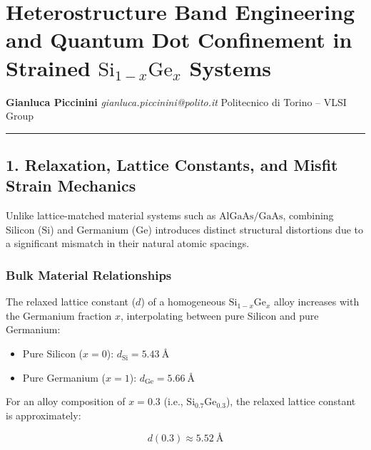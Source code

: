 \documentclass[
]{article}
\providecommand{\tightlist}{%
  \setlength{\itemsep}{0pt}\setlength{\parskip}{0pt}}
\begin{document}
\section{\texorpdfstring{Heterostructure Band Engineering and Quantum
Dot Confinement in Strained \(\text{Si}_{1-x}\text{Ge}_x\)
Systems}{Heterostructure Band Engineering and Quantum Dot Confinement in Strained \textbackslash text\{Si\}\_\{1-x\}\textbackslash text\{Ge\}\_x Systems}}\label{heterostructure-band-engineering-and-quantum-dot-confinement-in-strained-textsi_1-xtextge_x-systems}

\textbf{Gianluca Piccinini} \emph{gianluca.piccinini@polito.it}
Politecnico di Torino -- VLSI Group

\begin{center}\rule{0.5\linewidth}{0.5pt}\end{center}

\subsection{1. Relaxation, Lattice Constants, and Misfit Strain
Mechanics}\label{relaxation-lattice-constants-and-misfit-strain-mechanics}

Unlike lattice-matched material systems such as \(\text{AlGaAs/GaAs}\),
combining Silicon (\(\text{Si}\)) and Germanium (\(\text{Ge}\))
introduces distinct structural distortions due to a significant mismatch
in their natural atomic spacings.

\subsubsection{Bulk Material
Relationships}\label{bulk-material-relationships}

The relaxed lattice constant (\(d\)) of a homogeneous
\(\text{Si}_{1-x}\text{Ge}_x\) alloy increases with the Germanium
fraction \(x\), interpolating between pure Silicon and pure Germanium:

\begin{itemize}
\tightlist
\item
  Pure Silicon (\(x = 0\)): \(d_{\text{Si}} = 5.43\ \text{Å}\)
\item
  Pure Germanium (\(x = 1\)): \(d_{\text{Ge}} = 5.66\ \text{Å}\)
\end{itemize}

For an alloy composition of \(x = 0.3\) (i.e.,
\(\text{Si}_{0.7}\text{Ge}_{0.3}\)), the relaxed lattice constant is
approximately:

\[d(0.3) \approx 5.52\ \text{Å}\]
\end{document}
